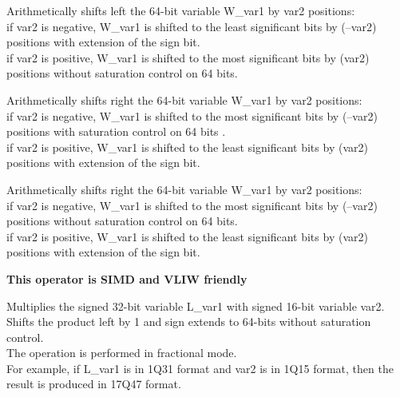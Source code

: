 
Arithmetically shifts left the 64-bit variable W\_var1 by var2 positions:\\
if var2 is negative, W\_var1 is shifted to the least significant bits by (–var2) positions with extension of the sign bit.\\
if var2 is positive, W\_var1 is shifted to the most significant bits by (var2) positions without saturation control on 64 bits.



Arithmetically shifts right the 64-bit variable W\_var1 by var2 positions:\\
if var2 is negative, W\_var1 is shifted to the most significant bits by (–var2) positions with saturation control on 64 bits .\\
if var2 is positive, W\_var1 is shifted to the least significant bits by (var2) positions with extension of the sign bit.



Arithmetically shifts right the 64-bit variable W\_var1 by var2 positions:\\
if var2 is negative, W\_var1 is shifted to the most significant bits by (–var2) positions without saturation control on 64 bits.\\
if var2 is positive, W\_var1 is shifted to the least significant bits by (var2) positions with extension of the sign bit.



\textbf{ This operator is SIMD and VLIW friendly}

Multiplies the signed 32-bit variable L\_var1 with signed 16-bit variable var2.
Shifts the product left by 1 and sign extends to 64-bits without saturation control. \\
The operation is performed in fractional mode.\\
For example, if L\_var1 is in 1Q31 format and var2 is in 1Q15 format, then the result is produced in 17Q47 format.


